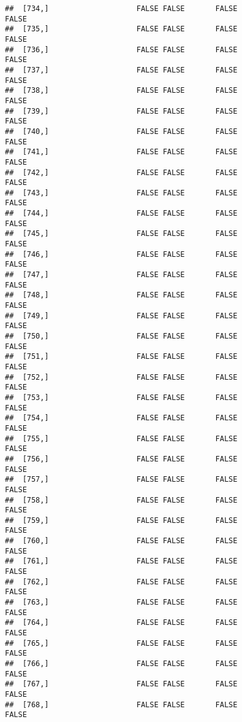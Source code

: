 \documentclass[
]{article}
\begin{document}
\begin{verbatim}
##  [734,]                    FALSE FALSE       FALSE                FALSE
##  [735,]                    FALSE FALSE       FALSE                FALSE
##  [736,]                    FALSE FALSE       FALSE                FALSE
##  [737,]                    FALSE FALSE       FALSE                FALSE
##  [738,]                    FALSE FALSE       FALSE                FALSE
##  [739,]                    FALSE FALSE       FALSE                FALSE
##  [740,]                    FALSE FALSE       FALSE                FALSE
##  [741,]                    FALSE FALSE       FALSE                FALSE
##  [742,]                    FALSE FALSE       FALSE                FALSE
##  [743,]                    FALSE FALSE       FALSE                FALSE
##  [744,]                    FALSE FALSE       FALSE                FALSE
##  [745,]                    FALSE FALSE       FALSE                FALSE
##  [746,]                    FALSE FALSE       FALSE                FALSE
##  [747,]                    FALSE FALSE       FALSE                FALSE
##  [748,]                    FALSE FALSE       FALSE                FALSE
##  [749,]                    FALSE FALSE       FALSE                FALSE
##  [750,]                    FALSE FALSE       FALSE                FALSE
##  [751,]                    FALSE FALSE       FALSE                FALSE
##  [752,]                    FALSE FALSE       FALSE                FALSE
##  [753,]                    FALSE FALSE       FALSE                FALSE
##  [754,]                    FALSE FALSE       FALSE                FALSE
##  [755,]                    FALSE FALSE       FALSE                FALSE
##  [756,]                    FALSE FALSE       FALSE                FALSE
##  [757,]                    FALSE FALSE       FALSE                FALSE
##  [758,]                    FALSE FALSE       FALSE                FALSE
##  [759,]                    FALSE FALSE       FALSE                FALSE
##  [760,]                    FALSE FALSE       FALSE                FALSE
##  [761,]                    FALSE FALSE       FALSE                FALSE
##  [762,]                    FALSE FALSE       FALSE                FALSE
##  [763,]                    FALSE FALSE       FALSE                FALSE
##  [764,]                    FALSE FALSE       FALSE                FALSE
##  [765,]                    FALSE FALSE       FALSE                FALSE
##  [766,]                    FALSE FALSE       FALSE                FALSE
##  [767,]                    FALSE FALSE       FALSE                FALSE
##  [768,]                    FALSE FALSE       FALSE                FALSE

\end{verbatim}
\end{document}
